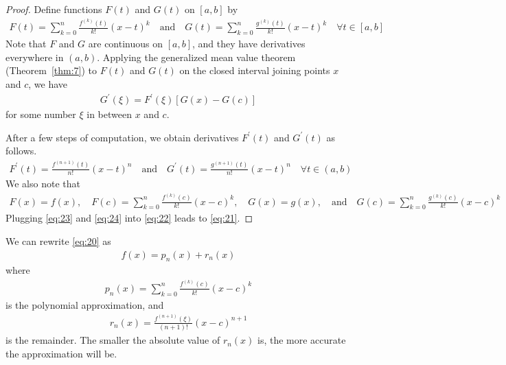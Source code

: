 \documentclass[thmcnt=section, 12pt]{my-elegantbook}
\begin{document}
\begin{proof}
    Define functions $F(t)$ and $G(t)$ on $[a, b]$ by
    \begin{align*}
        F(t) = \sum_{k=0}^{n} \frac{f^{(k)}(t)}{k!}(x-t)^k
        \quad \text{and} \quad
        G(t) = \sum_{k=0}^{n} \frac{g^{(k)}(t)}{k!}(x-t)^k
        \quad \forall t \in [a, b]
    \end{align*}
    Note that $F$ and $G$ are continuous on $[a, b]$, and they have derivatives everywhere in $(a, b)$. Applying the generalized mean value theorem (Theorem~\ref{thm:7}) to $F(t)$ and $G(t)$ on the closed interval joining points $x$ and $c$, we have
    \begin{align}
        [F(x) - F(c)] G^\prime(\xi)
        = F^\prime(\xi) [G(x) - G(c)]
        \label{eq:22}
    \end{align}
    for some number $\xi$ in between $x$ and $c$.

    \par After a few steps of computation, we obtain derivatives $F^\prime(t)$ and $G^\prime(t)$ as follows.
    \begin{align}
        F^\prime(t) = \frac{f^{(n+1)}(t)}{n!}(x-t)^{n}
        \quad \text{and} \quad
        G^\prime(t) = \frac{g^{(n+1)}(t)}{n!}(x-t)^{n}
        \quad \forall t \in (a, b)
        \label{eq:23}
    \end{align}
    We also note that
    \begin{align}
        F(x) = f(x),
        \quad
        F(c) = \sum_{k=0}^{n} \frac{f^{(k)}(c)}{k!}(x-c)^k,
        \quad
        G(x) = g(x),
        \quad \text{and} \quad
        G(c) = \sum_{k=0}^{n} \frac{g^{(k)}(c)}{k!}(x-c)^k
        \label{eq:24}
    \end{align}
    Plugging \eqref{eq:23} and \eqref{eq:24} into \eqref{eq:22} leads to \eqref{eq:21}.
\end{proof}

\par We can rewrite \eqref{eq:20} as
\begin{align*}
    f(x) = p_n(x) + r_n(x)
\end{align*}
where
\begin{align*}
    p_n(x) = \sum_{k=0}^{n} \frac{f^{(k)}(c)}{k!}(x-c)^k
\end{align*}
is the polynomial approximation, and
\begin{align*}
    r_n(x) = \frac{f^{(n+1)}(\xi)}{(n+1)!} (x-c)^{n+1}
\end{align*}
is the remainder. The smaller the absolute value of $r_n(x)$ is, the more accurate the approximation will be.
\end{document}
